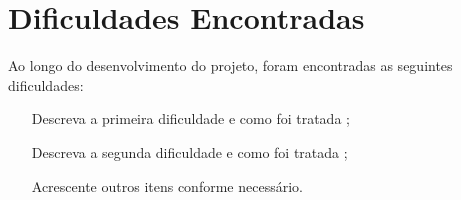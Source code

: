 \section{Dificuldades Encontradas}


Ao longo do desenvolvimento do projeto, foram encontradas as seguintes dificuldades:

\begin{itemize}
    \item [Descreva a primeira dificuldade e como foi tratada];
    \item [Descreva a segunda dificuldade e como foi tratada];
    \item [Acrescente outros itens conforme necessário.]
\end{itemize}